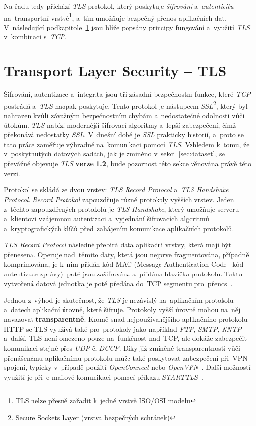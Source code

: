 Na řadu tedy přichází \textit{TLS} protokol, který poskytuje \textit{šifrování} a~\textit{autenticitu} na~transportní vrstvě\footnote{TLS nelze přesně zařadit k~jedné vrstvě ISO/OSI modelu}, a~tím umožňuje bezpečný přenos aplikačních dat. V~následující podkapitole~\ref{sec:tls} jsou blíže popsány principy fungování a~využití \textit{TLS} v~kombinaci s~\textit{TCP}.

\section{Transport Layer Security – TLS}
\label{sec:tls}
Šifrování, autentizace a~integrita jsou tři zásadní bezpečnostní funkce, které \textit{TCP} postrádá a~\textit{TLS} naopak poskytuje. Tento protokol je nástupcem \textit{SSL}\footnote{Secure Sockets Layer (vrstva bezpečných schránek)}, který byl nahrazen kvůli závažným bezpečnostním chybám a~nedostatečné odolnosti vůči útokům. \textit{TLS} nabízí modernější šifrovací algoritmy a~lepší zabezpečení, čímž překonává nedostatky \textit{SSL}. V~dnešní době je \textit{SSL} prakticky historií, a~proto se tato práce zaměřuje výhradně na~komunikaci pomocí \textit{TLS}. Vzhledem k~tomu, že v~poskytnutých datových sadách, jak je zmíněno v~sekci~\ref{sec:dataset}, se převážně objevuje \textit{TLS} \textbf{verze 1.2}, bude pozornost této sekce věnována právě této verzi.

Protokol se skládá ze dvou vrstev: \textit{TLS Record Protocol} a~\textit{TLS Handshake Protocol}. \textit{Record Protokol} zapouzdřuje různé protokoly vyšších vrstev. Jeden z~těchto zapouzdřených protokolů je \textit{TLS Handshake}, který umožňuje serveru a~klientovi vzájemnou autentizaci a~vyjednání šifrovacích algoritmů a~kryptografických klíčů před~zahájením komunikace aplikačních protokolů.

\textit{TLS Record Protocol} následně přebírá data aplikační vrstvy, která mají být přenesena. Operuje nad~těmito daty, která jsou nejprve fragmentována, případně komprimována, je k~nim přidán kód MAC (Message Authentication Code\,--\,kód autentizace zprávy), poté jsou zašifrována a~přidána hlavička protokolu. Takto vytvořená datová jednotka je poté předána do~TCP segmentu pro~přenos~\cite{Stallings2017}.


Jednou z~výhod je skutečnost, že \textit{TLS} je nezávislý na~aplikačním protokolu a~datech aplikační úrovně, které šifruje. Protokoly vyšší úrovně mohou na~něj navazovat \textbf{transparentně}. Kromě snad nejpoužívanějšího aplikačního protokolu HTTP se TLS využívá také pro~protokoly jako například \textit{FTP}, \textit{SMTP}, \textit{NNTP} a~další. TLS není omezeno pouze na~funkčnost nad~TCP, ale dokáže zabezpečit komunikaci stejně přes \textit{UDP} či \textit{DCCP}. Díky již zmíněné transparentnosti vůči přenášenému aplikačnímu protokolu může také poskytovat zabezpečení při~VPN spojení, typicky v~případě použití \textit{OpenConnect} nebo \textit{OpenVPN}~\cite{rfc-sec_proto}. Další možností využití je při~e-mailové komunikaci pomocí příkazu \textit{STARTTLS}~\cite{matousek2014}.

